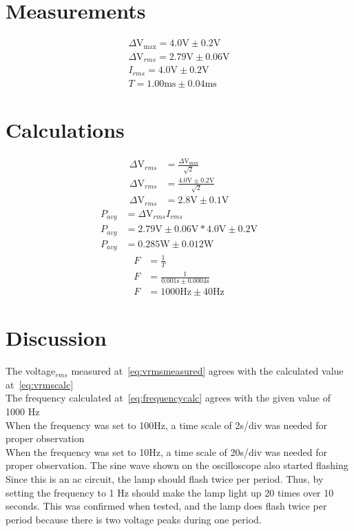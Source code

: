 \documentclass{report}
\begin{document}
\section{Measurements}

\begin{gather}
    \Delta\si{\volt}_{\max}=4.0\si{\volt}\pm0.2\si{\volt}\\
    \Delta\si{\volt}_{rms}=2.79\si{\volt}\pm0.06\si{\volt} \label{eq:vrmsmeasured}\\
    I_{rms}=4.0\si{\volt}\pm0.2\si{\volt}\\ 
    T=1.00\si{\milli}\si{\second}\pm0.04\si{\milli}\si{\second}
\end{gather}

\section{Calculations}
\begin{align}
    \Delta\si{\volt}_{rms}&=\frac{\Delta\si{\volt}_{\max}}{\sqrt{2}} \nonumber\\
    \Delta\si{\volt}_{rms}&=\frac{4.0\si{\volt}\pm0.2\si{\volt}}{\sqrt{2}}\nonumber\\
    \Delta\si{\volt}_{rms}&=2.8\si{\volt}\pm0.1\si{\volt} \label{eq:vrmscalc}
\end{align}
\begin{align}
    P_{avg}&=\Delta\si{\volt}_{rms}I_{rms}\nonumber\\
    P_{avg}&=2.79\si{\volt}\pm0.06\si{\volt} * 4.0\si{\volt}\pm0.2\si{\volt} \nonumber\\ 
    P_{avg}&=0.285\si{\watt}\pm0.012\si{\watt}
\end{align}
\begin{align}
    F&=\frac{1}{T} \nonumber\\
    F &=\frac{1}{0.001 \si{\second} \pm 0.0004 \si{\second} }\nonumber\\ 
    F &=1000\si{\hertz} \pm 40\si{\hertz} \label{eq:frequencycalc}
\end{align}

\section{Discussion}
The voltage$_{rms}$ measured at~\eqref{eq:vrmsmeasured} agrees with the calculated value at~\eqref{eq:vrmscalc}\\
The frequency calculated at~\eqref{eq:frequencycalc} agrees with the given value of 1000 \si{\hertz}\\
When the frequency was set to 100\si{\hertz}, a time scale of 2\si{\milli}\si{\second}/div was needed for proper observation\\
When the frequency was set to 10\si{\hertz}, a time scale of 20\si{\milli}\si{\second}/div was needed for proper observation. The sine wave shown on the oscilloscope also started flashing\\
Since this is an ac circuit, the lamp should flash twice per period. Thus, by setting the frequency to 1 \si{\hertz} should make the lamp light up 20 times over 10 seconds. This was confirmed when tested, and the lamp does flash twice per period because there is two voltage peaks during one period.
\end{document}
